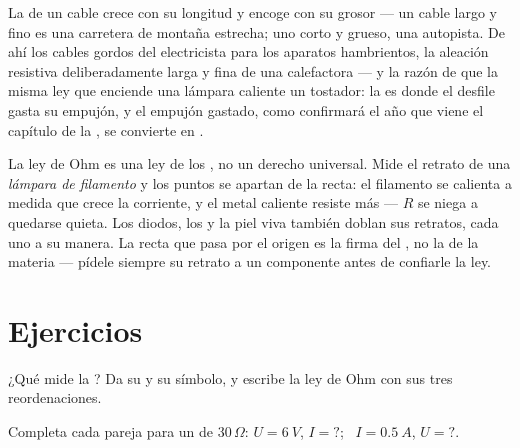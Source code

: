 \begin{example}\label{ex:g8:ohms-law:wires}
La  de un cable crece con su longitud y encoge con su
grosor --- un cable largo y fino es una carretera de montaña estrecha;
uno corto y grueso, una autopista. De ahí los cables gordos del
electricista para los aparatos hambrientos, la aleación resistiva
deliberadamente larga y fina de una  calefactora --- y la
razón de que la misma ley que enciende una lámpara caliente un
tostador: la  es donde el desfile gasta su empujón, y
el empujón gastado, como confirmará el año que viene el capítulo de la
, se convierte en .
\end{example}

\begin{remark}\label{rem:g8:ohms-law:limits}
La ley de Ohm es una ley de los , no un derecho
universal. Mide el retrato de una \emph{lámpara de filamento} y los
puntos se apartan de la recta: el filamento se calienta a medida
que crece la corriente, y el metal caliente resiste más --- $R$ se
niega a quedarse quieta. Los diodos, los  y la piel viva
también doblan sus retratos, cada uno a su manera. La recta que pasa
por el origen es la firma del , no la de la materia ---
pídele siempre su retrato a un componente antes de confiarle la ley.
\end{remark}

\section{Ejercicios}

\begin{exercise}[$\star$]\label{exo:g8:ohms-law:1}
¿Qué mide la ? Da su  y su
símbolo, y escribe la ley de Ohm con sus tres reordenaciones.
\end{exercise}

\begin{exercise}[$\star$]\label{exo:g8:ohms-law:2}
Completa cada pareja para un  de $30\,\Omega$: $U =
\qty{6}{V}$, $I = {?}$; \ $I = \qty{0.5}{A}$, $U = {?}$.
\end{exercise}

